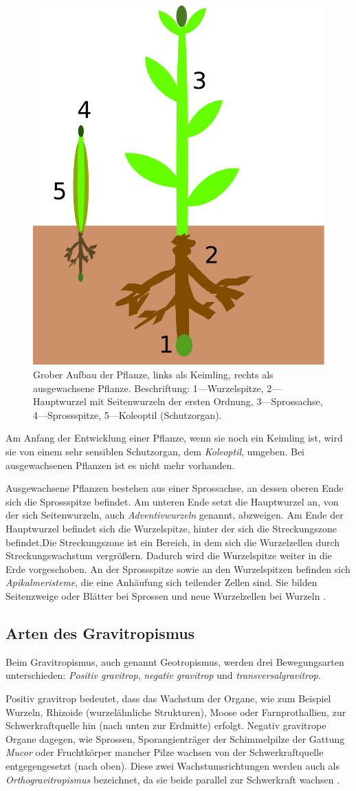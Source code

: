 \documentclass[
11pt, 
ngerman,
listof=totocnumbered,
oneside,
bibliography=totocnumbered,
abstracton
]{scrreprt}
\begin{document}
\begin{figure}[H]
	\centering 
	\includegraphics[width = 0.3\linewidth]{images/Spross.pdf}
	\caption{Grober Aufbau der Pflanze, links als Keimling, rechts als ausgewachsene Pflanze. Beschriftung: 1---Wurzelspitze, 2---Hauptwurzel mit Seitenwurzeln der ersten Ordnung, 3---Sprossachse, 4---Sprossspitze, 5---Koleoptil (Schutzorgan).}
\end{figure}

Am Anfang der Entwicklung einer Pflanze, wenn sie noch ein Keimling ist, wird sie von einem sehr sensiblen Schutzorgan, dem \emph{Koleoptil}, umgeben. Bei ausgewachsenen Pflanzen ist es nicht mehr vorhanden. 

Ausgewachsene Pflanzen bestehen aus einer Sprossachse, an dessen oberen Ende sich die Sprossspitze befindet. Am unteren Ende setzt die Hauptwurzel an, von der sich Seitenwurzeln, auch \emph{Adventivwurzeln} genannt, abzweigen. Am Ende der Hauptwurzel befindet sich die Wurzelspitze, hinter der sich die Streckungszone befindet.Die Streckungszone ist ein Bereich, in dem sich die Wurzelzellen durch Streckungswachstum vergrößern. Dadurch wird die Wurzelspitze weiter in die Erde vorgeschoben. An der Sprossspitze sowie an den Wurzelspitzen befinden sich \emph{Apikalmeristeme}, die eine Anhäufung sich teilender Zellen sind. Sie bilden Seitenzweige oder Blätter bei Sprossen und neue Wurzelzellen bei Wurzeln \parencite[1009--1011]{campbell}. 

\subsection{Arten des Gravitropismus}

Beim Gravitropismus, auch genannt Geotropismus, werden drei Bewegungsarten unterschieden: \emph{Positiv gravitrop},  \emph{negativ gravitrop} und \emph{transversalgravitrop}.

Positiv gravitrop bedeutet, dass das Wachstum der Organe, wie zum Beispiel Wurzeln, Rhizoide (wurzelähnliche Strukturen), Moose oder Farnprothallien, zur Schwerkraftquelle hin (nach unten zur Erdmitte) erfolgt. Negativ gravitrope Organe dagegen, wie Sprossen, Sporangienträger der Schimmelpilze der Gattung \emph{Mucor} oder Fruchtkörper mancher Pilze wachsen von der Schwerkraftquelle entgegengesetzt (nach oben). Diese zwei Wachstumsrichtungen werden auch als \emph{Orthogravitropismus} bezeichnet, da sie beide parallel zur Schwerkraft wachsen \parencite[546]{Jacob}.
\end{document}
